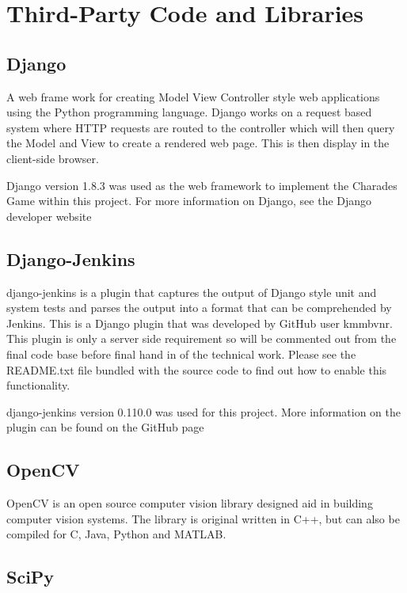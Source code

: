 \chapter{Third-Party Code and Libraries}

\section{Django}

A web frame work for creating Model View Controller style web applications using the Python programming language. Django works on a request based system where HTTP requests are routed to the controller which will then query the Model and View to create a rendered web page. This is then display in the client-side browser. 

Django version 1.8.3 was used as the web framework to implement the Charades Game within this project. For more information on Django, see the Django developer website %

\section{Django-Jenkins}

django-jenkins is a plugin that captures the output of Django style unit and system tests and parses the output into a format that can be comprehended by Jenkins. This is a Django plugin that was developed by GitHub user kmmbvnr. This plugin is only a server side requirement so will be commented out from the final code base before final hand in of the technical work. Please see the README.txt file bundled with the source code to find out how to enable this functionality.

django-jenkins version 0.110.0 was used for this project. More information on the plugin can be found on the GitHub page %

\section{OpenCV}

OpenCV is an open source computer vision library designed aid in building computer vision systems. The library is original written in C++, but can also be compiled for C, Java, Python and MATLAB. 
	
\section{SciPy}
 
